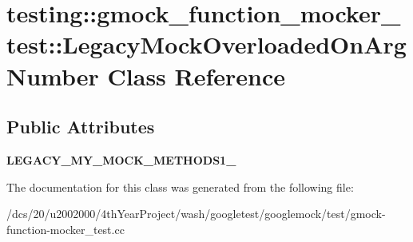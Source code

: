 \hypertarget{classtesting_1_1gmock__function__mocker__test_1_1LegacyMockOverloadedOnArgNumber}{}\section{testing\+:\+:gmock\+\_\+function\+\_\+mocker\+\_\+test\+:\+:Legacy\+Mock\+Overloaded\+On\+Arg\+Number Class Reference}
\label{classtesting_1_1gmock__function__mocker__test_1_1LegacyMockOverloadedOnArgNumber}
\subsection*{Public Attributes}
\begin{DoxyCompactItemize}
\item 
\mbox{\label{classtesting_1_1gmock__function__mocker__test_1_1LegacyMockOverloadedOnArgNumber_a562a9923cce1907eb00e98d011728c49}} 
{\bfseries L\+E\+G\+A\+C\+Y\+\_\+\+M\+Y\+\_\+\+M\+O\+C\+K\+\_\+\+M\+E\+T\+H\+O\+D\+S1\+\_\+}
\end{DoxyCompactItemize}


The documentation for this class was generated from the following file\+:\begin{DoxyCompactItemize}
\item 
/dcs/20/u2002000/4th\+Year\+Project/wash/googletest/googlemock/test/gmock-\/function-\/mocker\+\_\+test.\+cc\end{DoxyCompactItemize}
